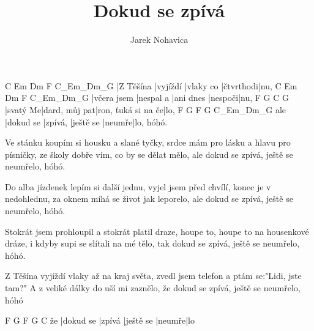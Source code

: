 \documentclass{song}
\title{Dokud se zpívá}
\author{Jarek Nohavica}
\begin{document}
\strophe
C         Em       Dm        F         C_Em_Dm_G
|Z Těšína |vyjíždí |vlaky co |čtvrthodi|nu,
C           Em        Dm        F       C_Em_Dm_G
|včera jsem |nespal a |ani dnes |nespoči|nu,
F        G             C                  G
|svatý Me|dard, můj pat|ron, ťuká si na če|lo,
    F         G       F         G      C_Em_Dm_G
ale |dokud se |zpívá, |ještě se |neumře|lo, hóhó.
\endstrophe

\strophe*
Ve stánku koupím si housku a slané tyčky,
srdce mám pro lásku a hlavu pro písničky,
ze školy dobře vím, co by se dělat mělo,
ale dokud se zpívá, ještě se neumřelo, hóhó.
\endstrophe

\strophe*
Do alba jízdenek lepím si další jednu,
vyjel jsem před chvílí, konec je v nedohlednu,
za oknem míhá se život jak leporelo,
ale dokud se zpívá, ještě se neumřelo, hóhó.
\endstrophe

\strophe*
Stokrát jsem prohloupil a stokrát platil draze,
houpe to, houpe to na housenkové dráze,
i kdyby supi se slítali na mé tělo,
tak dokud se zpívá, ještě se neumřelo, hóhó.
\endstrophe

\strophe*
Z Těšína vyjíždí vlaky až na kraj světa,
zvedl jsem telefon a ptám se:"Lidi, jste tam?"
A z veliké dálky do uší mi zaznělo,
že dokud se zpívá, ještě se neumřelo, hóhó
\endstrophe

\strophe
   F         G      F         G      C
že |dokud se |zpívá |ještě se |neumře|lo
\endstrophe
\end{document}
